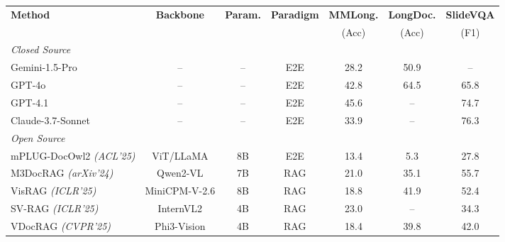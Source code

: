 \documentclass[letterpaper]{article} %
\begin{document}
\begin{table}[t]
\centering
\small
{}

\begin{tabular}{lccc>{\columncolor{primarycol}}ccc}
\toprule

\multirow{2}{*}{\textbf{Method}}
&
\multirow{2}{*}{\textbf{Backbone}}
&
\multirow{2}{*}{\textbf{Param.}}
&
\multirow{2}{*}{\textbf{Paradigm}}
&
\cellcolor{primarycol}\textbf{MMLong.}
&
\textbf{LongDoc.}
&
\textbf{SlideVQA}
\\

&
&
&
&
\cellcolor{primarycol}(Acc)
&
(Acc)
&
(F1)
\\

\midrule

\multicolumn{7}{l}{\it\color{gray} Closed Source}\\

Gemini-1.5-Pro
& --
& --
& E2E
& \cellcolor{primarycol}28.2
& 50.9
& --
\\

GPT-4o
& --
& --
& E2E
& \cellcolor{primarycol}42.8
& 64.5
& 65.8
\\

GPT-4.1
& --
& --
& E2E
& \cellcolor{primarycol}45.6
& --
& 74.7
\\

Claude-3.7-Sonnet
& --
& --
& E2E
& \cellcolor{primarycol}33.9
& --
& 76.3
\\

\midrule

\multicolumn{7}{l}{\it\color{gray} Open Source}\\

mPLUG-DocOwl2 \scriptsize\itshape\color{gray}(ACL'25)
& ViT/LLaMA
& 8B
& E2E
& \cellcolor{primarycol}13.4
& 5.3
& 27.8
\\

M3DocRAG \scriptsize\itshape\color{gray}(arXiv'24)
& Qwen2-VL
& 7B
& RAG
& \cellcolor{primarycol}21.0
& 35.1
& 55.7
\\

VisRAG \scriptsize\itshape\color{gray}(ICLR'25)
& MiniCPM-V-2.6
& 8B
& RAG
& \cellcolor{primarycol}18.8
& 41.9
& 52.4
\\

SV-RAG \scriptsize\itshape\color{gray}(ICLR'25)
& InternVL2
& 4B
& RAG
& \cellcolor{primarycol}23.0
& --
& 34.3
\\

VDocRAG \scriptsize\itshape\color{gray}(CVPR'25)
& Phi3-Vision
& 4B
& RAG
& \cellcolor{primarycol}18.4
& 39.8
& 42.0
\\


\end{tabular}
\end{table}
\end{document}

